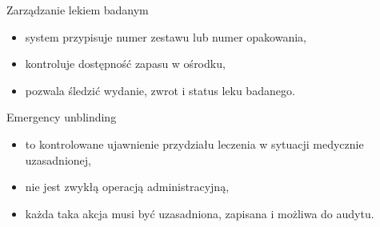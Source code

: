 \begin{frame}{Zarządzanie lekiem badanym}
  \begin{itemize}
    \item system przypisuje numer zestawu lub numer opakowania,
    \item kontroluje dostępność zapasu w ośrodku,
    \item pozwala śledzić wydanie, zwrot i status leku badanego.
  \end{itemize}
\end{frame}

\begin{frame}{Emergency unblinding}
  \begin{itemize}
    \item to kontrolowane ujawnienie przydziału leczenia w sytuacji medycznie uzasadnionej,
    \item nie jest zwykłą operacją administracyjną,
    \item każda taka akcja musi być uzasadniona, zapisana i możliwa do audytu.
  \end{itemize}
\end{frame}

